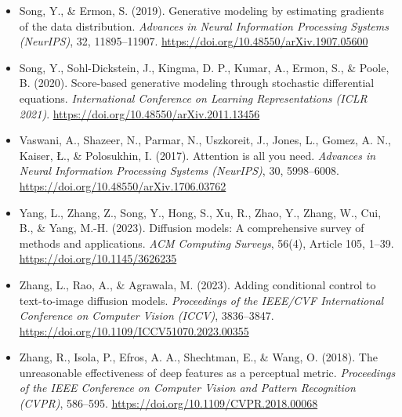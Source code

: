 \begin{itemize}[leftmargin=1.5em, label={}, itemsep=0.22ex, parsep=0pt]
    \item Song, Y., \& Ermon, S. (2019). Generative modeling by estimating gradients of the data distribution. \textit{Advances in Neural Information Processing Systems (NeurIPS)}, 32, 11895--11907. \url{https://doi.org/10.48550/arXiv.1907.05600}
    \item Song, Y., Sohl-Dickstein, J., Kingma, D. P., Kumar, A., Ermon, S., \& Poole, B. (2020). Score-based generative modeling through stochastic differential equations. \textit{International Conference on Learning Representations (ICLR 2021)}. \url{https://doi.org/10.48550/arXiv.2011.13456}
    \item Vaswani, A., Shazeer, N., Parmar, N., Uszkoreit, J., Jones, L., Gomez, A. N., Kaiser, \L., \& Polosukhin, I. (2017). Attention is all you need. \textit{Advances in Neural Information Processing Systems (NeurIPS)}, 30, 5998--6008. \url{https://doi.org/10.48550/arXiv.1706.03762}
    \item Yang, L., Zhang, Z., Song, Y., Hong, S., Xu, R., Zhao, Y., Zhang, W., Cui, B., \& Yang, M.-H. (2023). Diffusion models: A comprehensive survey of methods and applications. \textit{ACM Computing Surveys}, 56(4), Article 105, 1--39. \url{https://doi.org/10.1145/3626235}
    \item Zhang, L., Rao, A., \& Agrawala, M. (2023). Adding conditional control to text-to-image diffusion models. \textit{Proceedings of the IEEE/CVF International Conference on Computer Vision (ICCV)}, 3836--3847. \url{https://doi.org/10.1109/ICCV51070.2023.00355}
    \item Zhang, R., Isola, P., Efros, A. A., Shechtman, E., \& Wang, O. (2018). The unreasonable effectiveness of deep features as a perceptual metric. \textit{Proceedings of the IEEE Conference on Computer Vision and Pattern Recognition (CVPR)}, 586--595. \url{https://doi.org/10.1109/CVPR.2018.00068}
\end{itemize}

